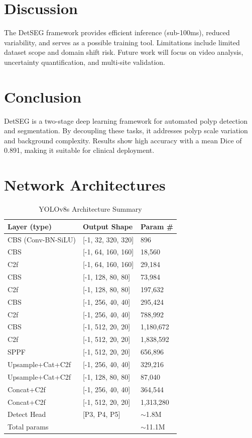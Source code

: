 \documentclass[11pt,a4paper]{article}
\begin{document}
\section{Discussion}
The DetSEG framework provides efficient inference (sub-100ms), reduced variability, and serves as a possible training tool. Limitations include limited dataset scope and domain shift risk. Future work will focus on video analysis, uncertainty quantification, and multi-site validation.

\section{Conclusion}
DetSEG is a two-stage deep learning framework for automated polyp detection and segmentation. By decoupling these tasks, it addresses polyp scale variation and background complexity. Results show high accuracy with a mean Dice of 0.891, making it suitable for clinical deployment.

\appendix
\section{Network Architectures}

\begin{table}[h]
\centering
\caption{YOLOv8s Architecture Summary}
\begin{tabular}{lll}
\toprule
Layer (type) & Output Shape & Param \# \\
\midrule
CBS (Conv-BN-SiLU) & [-1, 32, 320, 320] & 896 \\
CBS & [-1, 64, 160, 160] & 18,560 \\
C2f & [-1, 64, 160, 160] & 29,184 \\
CBS & [-1, 128, 80, 80] & 73,984 \\
C2f & [-1, 128, 80, 80] & 197,632 \\
CBS & [-1, 256, 40, 40] & 295,424 \\
C2f & [-1, 256, 40, 40] & 788,992 \\
CBS & [-1, 512, 20, 20] & 1,180,672 \\
C2f & [-1, 512, 20, 20] & 1,838,592 \\
SPPF & [-1, 512, 20, 20] & 656,896 \\
Upsample+Cat+C2f & [-1, 256, 40, 40] & 329,216 \\
Upsample+Cat+C2f & [-1, 128, 80, 80] & 87,040 \\
Concat+C2f & [-1, 256, 40, 40] & 364,544 \\
Concat+C2f & [-1, 512, 20, 20] & 1,313,280 \\
Detect Head & [P3, P4, P5] & $\sim$1.8M \\
\midrule
Total params & & $\sim$11.1M \\
\bottomrule
\end{tabular}
\end{table}
\end{document}
